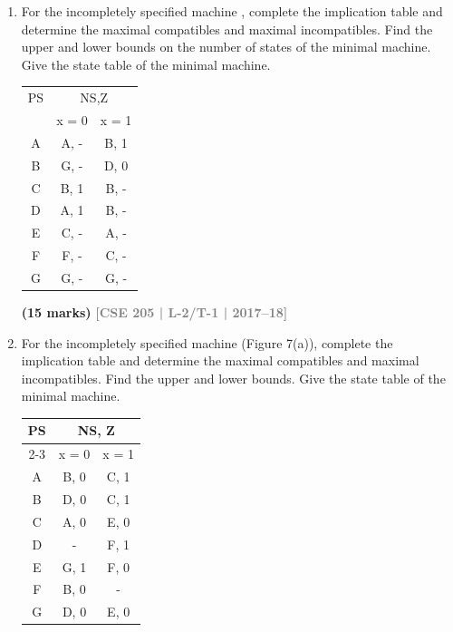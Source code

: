 \documentclass[12pt,a4paper]{article}
\newcommand{\yr}[1]{\hfill\textcolor{gray}{\small\textbf{[#1]}}}
\newcommand{\mk}[1]{\textcolor{orange!70!black}{\small\textbf{(#1 marks)}}}
\begin{document}
\begin{enumerate}

\item For the incompletely specified machine , complete the implication table and determine the maximal compatibles and maximal incompatibles. Find the upper and lower bounds on the number of states of the minimal machine. Give the state table of the minimal machine.
\begin{center}
  \begin{tabular}{c|cc}
PS & \multicolumn{2}{c}{NS,Z} \\
 & x = 0 & x = 1 \\
\hline
A & A, - & B, 1 \\
B & G, - & D, 0 \\
C & B, 1 & B, - \\
D & A, 1 & B, - \\
E & C, - & A, - \\
F & F, - & C, - \\
G & G, - & G, - \\
\end{tabular}
\end{center}
  
\mk{15} \yr{CSE 205 | L-2/T-1 | 2017--18}

\item For the incompletely specified machine (Figure 7(a)), complete the implication table and determine the maximal compatibles and maximal incompatibles. Find the upper and lower bounds. Give the state table of the minimal machine.

\begin{center}
  \begin{tabular}{|c|c|c|}
\hline
\multirow{2}{*}{PS} & \multicolumn{2}{c|}{NS, Z} \\ \cline{2-3} 
 & x = 0 & x = 1 \\ \hline
A & B, 0 & C, 1 \\ \hline
B & D, 0 & C, 1 \\ \hline
C & A, 0 & E, 0 \\ \hline
D & - & F, 1 \\ \hline
E & G, 1 & F, 0 \\ \hline
F & B, 0 & - \\ \hline
G & D, 0 & E, 0 \\ \hline
\end{tabular}
\end{center}


\end{enumerate}
\end{document}
